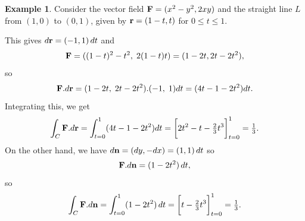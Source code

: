 \documentclass[reqno]{amsart}
\theoremstyle{definition}
\newtheorem{example}[theorem]{Example}
\begin{document}
\begin{example}
 Consider the vector field $\mathbf{F}=(x^2-y^2,2xy)$ and the straight line
 $L$ from $(1,0)$ to $(0,1)$, given by $\mathbf{r}=(1-t,t)$ for
 $0\leq t\leq 1$. 
 \begin{center}
 \end{center}
 This gives $d\mathbf{r}=(-1,1)\,dt$ and
 \[ \mathbf{F} = ((1-t)^2-t^2,\;2(1-t)t) = (1-2t,2t-2t^2), \]
 so 
 \[ \mathbf{F}.d\mathbf{r} = (1-2t,\;2t-2t^2).(-1,\;1)dt = (4t-1-2t^2)dt. \]
 Integrating this, we get
 \[ \int_C\vF.d\vr = \int_{t=0}^1 (4t-1-2t^2) dt= 
     \CH{2t^2-t-\tfrac{2}{3}t^3}_{t=0}^1 = \tfrac{1}{3}.
 \]
 On the other hand, we have $d\mathbf{n}=(dy,-dx)=(1,1)\,dt$ so 
 \[ \mathbf{F}.d\mathbf{n} = (1-2t^2)\,dt, \]
 so 
 \[ \int_C\vF.d\vn = \int_{t=0}^1 (1-2t^2)\,dt =
     \CH{t-\tfrac{2}{3}t^3}_{t=0}^1 = \tfrac{1}{3}.
 \]
\end{example}
\end{document}
